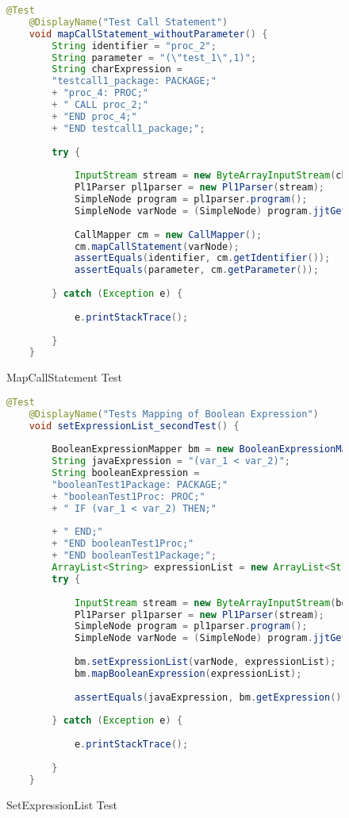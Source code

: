 \begin{figure}[H]\caption{MapCallStatement Test} \label{lst:callstatement_test}
	\begin{lstlisting}[language=Java]
	@Test
	@DisplayName("Test Call Statement")
	void mapCallStatement_withoutParameter() {
		String identifier = "proc_2";
		String parameter = "(\"test_1\",1)";
		String charExpression = 
		"testcall1_package: PACKAGE;" 
		+ "proc_4: PROC;"
		+ "	CALL proc_2;" 
		+ "END proc_4;" 
		+ "END testcall1_package;";
		
		try {
			
			InputStream stream = new ByteArrayInputStream(charExpression.getBytes(StandardCharsets.UTF_8));
			Pl1Parser pl1parser = new Pl1Parser(stream);
			SimpleNode program = pl1parser.program();
			SimpleNode varNode = (SimpleNode) program.jjtGetChild(0).jjtGetChild(1).jjtGetChild(1).jjtGetChild(0);
			
			CallMapper cm = new CallMapper();
			cm.mapCallStatement(varNode);
			assertEquals(identifier, cm.getIdentifier());
			assertEquals(parameter, cm.getParameter());
			
		} catch (Exception e) {
			
			e.printStackTrace();
			
		}
	}
	\end{lstlisting}
\end{figure}

\begin{figure}[H]\caption{SetExpressionList Test} \label{lst:branchmapping_test}
	\begin{lstlisting}[language=Java]
	@Test
	@DisplayName("Tests Mapping of Boolean Expression")
	void setExpressionList_secondTest() {
		
		BooleanExpressionMapper bm = new BooleanExpressionMapper();
		String javaExpression = "(var_1 < var_2)";
		String booleanExpression = 
		"booleanTest1Package: PACKAGE;"
		+ "booleanTest1Proc: PROC;"
		+ "	IF (var_1 < var_2) THEN;"
		
		+ "	END;"
		+ "END booleanTest1Proc;"
		+ "END booleanTest1Package;";
		ArrayList<String> expressionList = new ArrayList<String>();
		try {
			
			InputStream stream = new ByteArrayInputStream(booleanExpression.getBytes(StandardCharsets.UTF_8));
			Pl1Parser pl1parser = new Pl1Parser(stream);
			SimpleNode program = pl1parser.program();
			SimpleNode varNode = (SimpleNode) program.jjtGetChild(0).jjtGetChild(1).jjtGetChild(1).jjtGetChild(0).jjtGetChild(0);
			
			bm.setExpressionList(varNode, expressionList);
			bm.mapBooleanExpression(expressionList);
			
			assertEquals(javaExpression, bm.getExpression());
			
		} catch (Exception e) {
			
			e.printStackTrace();
			
		}
	}
	\end{lstlisting}
\end{figure}

